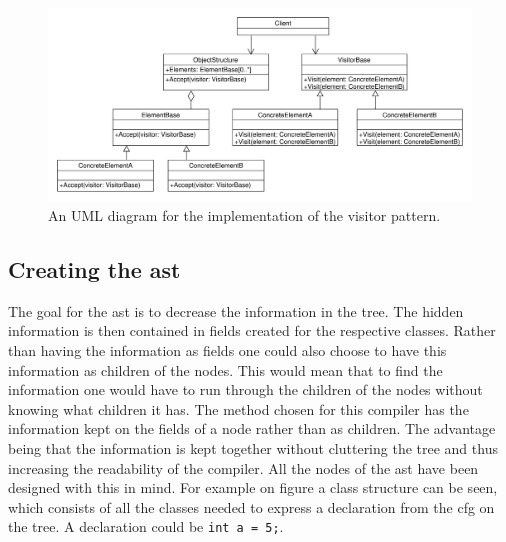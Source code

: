 \begin{figure}[!ht]
\centering
 \includegraphics[width=1\textwidth]{figures/ClassDiagrams/VisitorPattern.pdf} %
\caption{An UML diagram for the implementation of the visitor pattern.}\label{image:visitor}
\vspace{-15pt}
\end{figure}

\subsection{Creating the \acrshort{ast}}\label{CreatingAst}

The goal for the \acrshort{ast} is to decrease the information in the tree.
The hidden information is then contained in fields created for the respective classes.
Rather than having the information as fields one could also choose to have this information as children of the nodes.
This would mean that to find the information one would have to run through the children of the nodes without knowing what children it has.
The method chosen for this compiler has the information kept on the fields of a node rather than as children.
The advantage being that the information is kept together without cluttering the tree and thus increasing the readability of the compiler.
All the nodes of the \acrshort{ast} have been designed with this in mind.
For example on figure  a class structure can be seen, which consists of all the classes needed to express a declaration from the \acrshort{cfg} on the tree.
A declaration could be \texttt{int a = 5;}.

